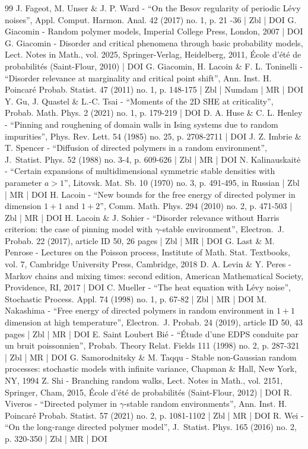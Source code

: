 \documentclass[10pt]{amsart}
\theoremstyle{definition}
\begin{document}
\begin{thebibliography}{99}
J. Fageot, M. Unser \& J. P. Ward - “On the Besov regularity of periodic Lévy noises”, Appl. Comput. Harmon. Anal. 42 (2017) no. 1, p. 21 -36 | Zbl | DOI
G. Giacomin - Random polymer models, Imperial College Press, London, 2007 | DOI
G. Giacomin - Disorder and critical phenomena through basic probability models, Lect. Notes in Math., vol. 2025, Springer-Verlag, Heidelberg, 2011, École d’été de probabilités (Saint-Flour, 2010) | DOI
G. Giacomin, H. Lacoin \& F. L. Toninelli - “Disorder relevance at marginality and critical point shift”, Ann. Inst. H. Poincaré Probab. Statist. 47 (2011) no. 1, p. 148-175 | Zbl | Numdam | MR | DOI
Y. Gu, J. Quastel \& L.-C. Tsai - “Moments of the 2D SHE at criticality”, Probab. Math. Phys. 2 (2021) no. 1, p. 179-219 | DOI
D. A. Huse \& C. L. Henley - “Pinning and roughening of domain walls in Ising systems due to random impurities”, Phys. Rev. Lett. 54 (1985) no. 25, p. 2708-2711 | DOI
J. Z. Imbrie \& T. Spencer - “Diffusion of directed polymers in a random environment”, J. Statist. Phys. 52 (1988) no. 3-4, p. 609-626 | Zbl | MR | DOI
N. Kalinauskaitė - “Certain expansions of multidimensional symmetric stable densities with parameter $a>1$”, Litovsk. Mat. Sb. 10 (1970) no. 3, p. 491-495, in Russian | Zbl | MR | DOI
H. Lacoin - “New bounds for the free energy of directed polymer in dimension $1+1$ and $1+2$”, Comm. Math. Phys. 294 (2010) no. 2, p. 471-503 | Zbl | MR | DOI
H. Lacoin \& J. Sohier - “Disorder relevance without Harris criterion: the case of pinning model with $\gamma $-stable environment”, Electron. J. Probab. 22 (2017), article ID 50, 26 pages | Zbl | MR | DOI
G. Last \& M. Penrose - Lectures on the Poisson process, Institute of Math. Stat. Textbooks, vol. 7, Cambridge University Press, Cambridge, 2018
D. A. Levin \& Y. Peres - Markov chains and mixing times: second edition, American Mathematical Society, Providence, RI, 2017 | DOI
C. Mueller - “The heat equation with Lévy noise”, Stochastic Process. Appl. 74 (1998) no. 1, p. 67-82 | Zbl | MR | DOI
M. Nakashima - “Free energy of directed polymers in random environment in $1+1$ dimension at high temperature”, Electron. J. Probab. 24 (2019), article ID 50, 43 pages | Zbl | MR | DOI
E. Saint Loubert Bié - “Étude d’une EDPS conduite par un bruit poissonnien”, Probab. Theory Relat. Fields 111 (1998) no. 2, p. 287-321 | Zbl | MR | DOI
G. Samorodnitsky \& M. Taqqu - Stable non-Gaussian random processes: stochastic models with infinite variance, Chapman \& Hall, New York, NY, 1994
Z. Shi - Branching random walks, Lect. Notes in Math., vol. 2151, Springer, Cham, 2015, École d’été de probabilités (Saint-Flour, 2012) | DOI
R. Viveros - “Directed polymer in $\gamma $-stable random environments”, Ann. Inst. H. Poincaré Probab. Statist. 57 (2021) no. 2, p. 1081-1102 | Zbl | MR | DOI
R. Wei - “On the long-range directed polymer model”, J. Statist. Phys. 165 (2016) no. 2, p. 320-350 | Zbl | MR | DOI
\end{thebibliography}
\end{document}
